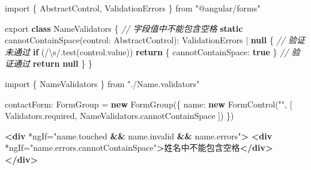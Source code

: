 \documentclass[
]{article}
\newenvironment{Shaded}{}{}
\newcommand{\AttributeTok}[1]{\textcolor[rgb]{0.49,0.56,0.16}{#1}}
\newcommand{\CommentTok}[1]{\textcolor[rgb]{0.38,0.63,0.69}{\textit{#1}}}
\newcommand{\ControlFlowTok}[1]{\textcolor[rgb]{0.00,0.44,0.13}{\textbf{#1}}}
\newcommand{\DataTypeTok}[1]{\textcolor[rgb]{0.56,0.13,0.00}{#1}}
\newcommand{\ErrorTok}[1]{\textcolor[rgb]{1.00,0.00,0.00}{\textbf{#1}}}
\newcommand{\FunctionTok}[1]{\textcolor[rgb]{0.02,0.16,0.49}{#1}}
\newcommand{\ImportTok}[1]{#1}
\newcommand{\KeywordTok}[1]{\textcolor[rgb]{0.00,0.44,0.13}{\textbf{#1}}}
\newcommand{\NormalTok}[1]{#1}
\newcommand{\OperatorTok}[1]{\textcolor[rgb]{0.40,0.40,0.40}{#1}}
\newcommand{\OtherTok}[1]{\textcolor[rgb]{0.00,0.44,0.13}{#1}}
\newcommand{\SpecialCharTok}[1]{\textcolor[rgb]{0.25,0.44,0.63}{#1}}
\newcommand{\SpecialStringTok}[1]{\textcolor[rgb]{0.73,0.40,0.53}{#1}}
\newcommand{\StringTok}[1]{\textcolor[rgb]{0.25,0.44,0.63}{#1}}
\begin{document}
\begin{Shaded}
\begin{Highlighting}[]
\ImportTok{import}\NormalTok{ \{ AbstractControl}\OperatorTok{,}\NormalTok{ ValidationErrors \} }\ImportTok{from} \StringTok{"@angular/forms"}

\ImportTok{export} \KeywordTok{class}\NormalTok{ NameValidators \{}
  \CommentTok{// 字段值中不能包含空格}
  \KeywordTok{static} \FunctionTok{cannotContainSpace}\NormalTok{(}\DataTypeTok{control}\OperatorTok{:}\NormalTok{ AbstractControl)}\OperatorTok{:}\NormalTok{ ValidationErrors }\OperatorTok{|} \KeywordTok{null}\NormalTok{ \{}
    \CommentTok{// 验证未通过}
    \ControlFlowTok{if}\NormalTok{ (}\SpecialStringTok{/}\SpecialCharTok{\textbackslash{}s}\SpecialStringTok{/}\OperatorTok{.}\FunctionTok{test}\NormalTok{(control}\OperatorTok{.}\AttributeTok{value}\NormalTok{)) }\ControlFlowTok{return}\NormalTok{ \{ }\DataTypeTok{cannotContainSpace}\OperatorTok{:} \KeywordTok{true}\NormalTok{ \}}
    \CommentTok{// 验证通过}
    \ControlFlowTok{return} \KeywordTok{null}
\NormalTok{  \}}
\NormalTok{\}}
\end{Highlighting}
\end{Shaded}

\begin{Shaded}
\begin{Highlighting}[]
\ImportTok{import}\NormalTok{ \{ NameValidators \} }\ImportTok{from} \StringTok{"./Name.validators"}

\NormalTok{contactForm}\OperatorTok{:}\NormalTok{ FormGroup }\OperatorTok{=} \KeywordTok{new} \FunctionTok{FormGroup}\NormalTok{(\{}
  \DataTypeTok{name}\OperatorTok{:} \KeywordTok{new} \FunctionTok{FormControl}\NormalTok{(}\StringTok{""}\OperatorTok{,}\NormalTok{ [}
\NormalTok{    Validators}\OperatorTok{.}\AttributeTok{required}\OperatorTok{,}
\NormalTok{    NameValidators}\OperatorTok{.}\AttributeTok{cannotContainSpace}
\NormalTok{  ])}
\NormalTok{\})}
\end{Highlighting}
\end{Shaded}

\begin{Shaded}
\begin{Highlighting}[]
\KeywordTok{\textless{}div}\OtherTok{ *ngIf=}\StringTok{"name.touched }\ErrorTok{\&\&}\StringTok{ name.invalid }\ErrorTok{\&\&}\StringTok{ name.errors"}\KeywordTok{\textgreater{}}
	\KeywordTok{\textless{}div}\OtherTok{ *ngIf=}\StringTok{"name.errors.cannotContainSpace"}\KeywordTok{\textgreater{}}\NormalTok{姓名中不能包含空格}\KeywordTok{\textless{}/div\textgreater{}}
\KeywordTok{\textless{}/div\textgreater{}}
\end{Highlighting}
\end{Shaded}
\end{document}
